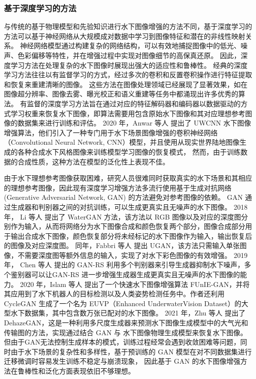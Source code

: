 \subsubsection{基于深度学习的方法}
与传统的基于物理模型和先验知识进行水下图像增强的方法不同，基于深度学习的方法可以基于神经网络从大规模成对数据中学习到图像特征和潜在的非线性映射关系。
神经网络模型通过构建复杂的网络结构，可以有效地捕捉图像中的低光、噪声、色彩偏移等特性，并在增强过程中实现对图像细节的高保真还原。
因此，深度学习方法在处理复杂的水下图像时展现出强大的适应性和鲁棒性。
经典的深度学习方法往往以有监督学习的方式，经过多次的卷积和反置卷积操作进行特征提取和恢复来重建清晰的图像。
这些方法在图像处理领域已经展现了显著效果，如在图像超分辨率\cite{cyberCSRnet}、图像去雾\cite{QCNN_H}、曝光校正\cite{Exposure_restoration}和语义重建\cite{InpaintingMissingArea}等任务中都涌现出许多优秀的算法。
有监督的深度学习方法旨在通过对应的特征解码器和编码器以数据驱动的方式学习权重来恢复水下图像，即算法需要用包含原始水下图像和其对应理想参考图像的数据集来进行训练和评估。
2020 年，Anwar 等人 \cite{uwcnn}提出了 UWCNN 水下图像增强算法，他们引入了一种专门用于水下场景图像增强的卷积神经网络（Convolutional Neural Network, CNN）模型，并且使用从现实世界陆地图像生成的各种合成水下风格图像来训练模型学习图像的恢复模式，
然而，由于训练数据的合成性质，这种方法在模型的泛化性上表现不佳。

由于水下理想参考图像获取困难，研究人员很难同时获取真实的水下场景和其相应的理想参考图像，因此现有深度学习增强方法多流行使用基于生成对抗网络(Generative Adversarial Network, GAN) \cite{gan}的方法避免对参考图像的依赖。
GAN 通过生成器和判别器之间的对抗训练，可以生成更真实且无噪声的水下图像。
2018 年， Li 等人 \cite{water_gan}提出了 WaterGAN 方法，该方法以 RGB 图像以及对应的深度图分别作为输入，从而将网络分为水下图像合成和颜色恢复两个部分，图像合成部分用于输出合成水下图像，颜色恢复部分将未经标记的水下图像作为输入，输出恢复后的图像及对应深度图。
同年，Fabbri 等人 \cite{ugan}提出 UGAN，该方法只需输入单张图像，不需要深度图等额外信息的输入，实现了对水下彩色图像的有效增强。
2019 年， Chen 等人 \cite{gan-rs}提出的 GAN-RS 利用多个判别器来引导生成器抑制水下噪声，多个鉴别器可以让GAN-RS 进一步增强生成器生成更真实且无噪声的水下图像的能力。
2020 年，Islam 等人 \cite{funie_gan}提出了一个快速水下图像增强算法 FUnIE-GAN，并将其应用到了水下机器人的目标检测以及人类姿势检测任务中。作者还利用 CycleGAN \cite{cycle_gan}生成了一个名为 EUVP（Enhanced UnderwaterVision Dataset）的大型水下数据集，其中包含数万张已配对的水下图像。
2021 年，Zhu 等人 \cite{dehaze_gan}提出了 DehazeGAN，这是一种利用多尺度生成器来预测水下图像生成模型中的大气光和传输图的方法，实现通过结合 GAN 与 水下图像物理生成模型来恢复水下图像。
但由于GAN无法控制生成样本的模式，训练过程经常会遇到收敛困难等问题，同时由于水下场景的复杂性和多样性，基于预训练的 GAN 模型在对不同数据集进行迁移微调时容易发生训练不稳定与崩溃现象，
因此基于 GAN 的水下图像增强方法在鲁棒性和泛化方面表现依旧不够理想。

